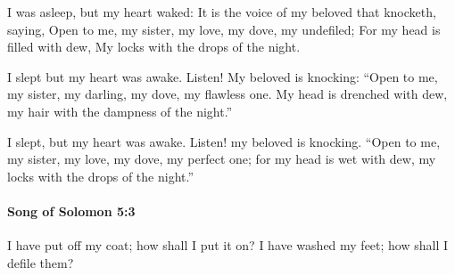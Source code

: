 			\begin{versebox}
					\item[BHS] 
					\item[LXX] 
					\item[ASV] I was asleep, but my heart waked: It is the voice of my beloved that knocketh, saying, Open to me, my sister, my love, my dove, my undefiled; For my head is filled with dew, My locks with the drops of the night.
					\item[NIV] I slept but my heart was awake. Listen! My beloved is knocking: “Open to me, my sister, my darling, my dove, my flawless one. My head is drenched with dew, my hair with the dampness of the night.”
					\item[NRSV] I slept, but my heart was awake. Listen! my beloved is knocking. “Open to me, my sister, my love, my dove, my perfect one; for my head is wet with dew, my locks with the drops of the night.”
			\end{versebox}

		\paragraph{Song of Solomon 5:3} %
			\label{SONGOFSOLOMON-5-3}

			I have put off my coat; how shall I put it on? I have washed my feet; how shall I defile them?

